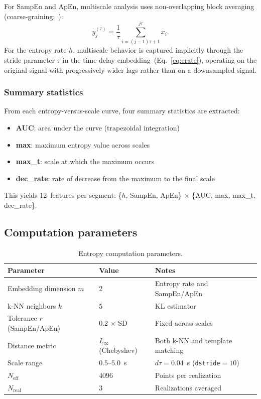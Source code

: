 \documentclass[12pt,a4paper]{article}
\begin{document}
For SampEn and ApEn, multiscale analysis uses non-overlapping block averaging (coarse-graining;~\citealt{costa2002}):
\begin{equation}\label{eq:coarsegrain}
  y_j^{(\tau)} = \frac{1}{\tau} \sum_{i=(j-1)\tau+1}^{j\tau} x_i.
\end{equation}
For the entropy rate $h$, multiscale behavior is captured implicitly through the stride parameter $\tau$ in the time-delay embedding~(Eq.~\ref{eq:erate}), operating on the original signal with progressively wider lags rather than on a downsampled signal.

\subsubsection{Summary statistics}

From each entropy-versus-scale curve, four summary statistics are extracted:
\begin{itemize}
  \item \textbf{AUC}: area under the curve (trapezoidal integration)
  \item \textbf{max}: maximum entropy value across scales
  \item \textbf{max\_t}: scale at which the maximum occurs
  \item \textbf{dec\_rate}: rate of decrease from the maximum to the final scale
\end{itemize}
This yields 12~features per segment: \{$h$, SampEn, ApEn\} $\times$ \{AUC, max, max\_t, dec\_rate\}.

\subsection{Computation parameters}\label{sec:params}

\begin{table}[htbp]
\centering
\caption{Entropy computation parameters.}\label{tab:params}
\begin{tabular}{@{}lll@{}}
\toprule
Parameter & Value & Notes \\
\midrule
Embedding dimension $m$ & 2 & Entropy rate and SampEn/ApEn \\
k-NN neighbors $k$ & 5 & KL estimator \\
Tolerance $r$ (SampEn/ApEn) & 0.2 $\times$ SD & Fixed across scales \\
Distance metric & $L_\infty$ (Chebyshev) & Both k-NN and template matching \\
Scale range & 0.5--5.0~s & $d\tau = 0.04$~s (\texttt{dstride}${}=10$) \\
$N_{\text{eff}}$ & 4096 & Points per realization \\
$N_{\text{real}}$ & 3 & Realizations averaged \\
\bottomrule
\end{tabular}
\end{table}
\end{document}
